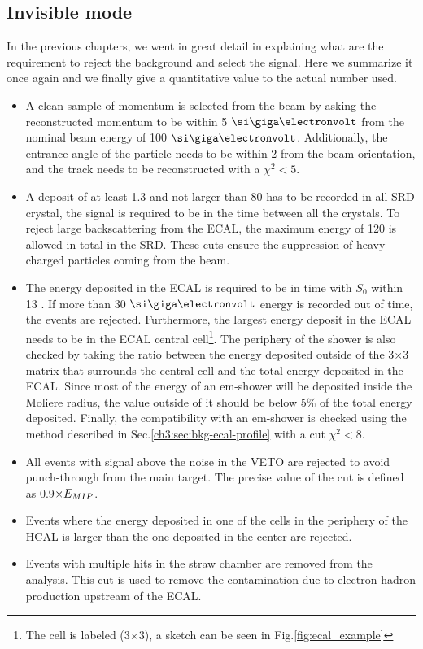 \subsection{Invisible mode}
\label{ch3:sec:selection-criteria-invis}

In the previous chapters, we went in great detail in explaining what are the requirement to reject the background and select the signal. Here we summarize it once again and we finally give a quantitative value to the actual number used.

\begin{itemize}
\item A clean sample of momentum is selected from the beam by asking the reconstructed momentum to be within 5 $\gev$ from the nominal beam energy of 100 $\gev$. Additionally, the entrance angle of the particle needs to be within 2 \mrad from the beam orientation, and the track needs to be reconstructed with a $\chi^2<5$.
\item A deposit of at least 1.3 \mev and not larger than 80 \mev has to be recorded in all SRD crystal, the signal is required to be in the time between all the crystals. To reject large backscattering from the ECAL, the maximum energy of 120 \mev is allowed in total in the SRD. These cuts ensure the suppression of heavy charged particles coming from the beam.
\item The energy deposited in the ECAL is required to be in time with $S_0$ within 13 \nas. If more than 30 $\gev$ energy is recorded out of time, the events are rejected. Furthermore, the largest energy deposit in the ECAL needs to be in the ECAL central cell\footnote{The cell is labeled (3$\times$3), a sketch can be seen in Fig.\ref{fig:ecal_example}}. The periphery of the shower is also checked by taking the ratio between the energy deposited outside of the 3$\times$3 matrix that surrounds the central cell and the total energy deposited in the ECAL. Since most of the energy of an em-shower will be deposited inside the Moliere radius, the value outside of it should be below 5\% of the total energy deposited. Finally, the compatibility with an em-shower is checked using the method described in Sec.\ref{ch3:sec:bkg-ecal-profile} with a cut $\chi^2 < 8$.
\item All events with signal above the noise in the VETO are rejected to avoid punch-through from the main target. The precise value of the cut is defined as 0.9$\times E_{MIP}$.
\item Events where the energy deposited in one of the cells in the periphery of the HCAL is larger than the one deposited in the center are rejected.
\item Events with multiple hits in the straw chamber are removed from the analysis. This cut is used to remove the contamination due to electron-hadron production upstream of the ECAL.
\end{itemize}

